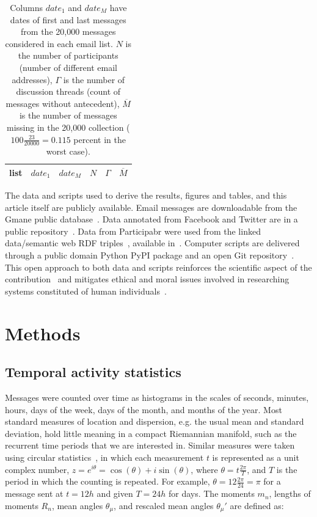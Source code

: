 \documentclass[%
aip,
jmp,%
amsmath,amssymb,
reprint,%
]{revtex4-1}
\begin{document}
\begin{table}
\centering
\caption{Columns $date_1$ and $date_M$ have dates of first and last messages from the 20,000 messages considered in each email list.
$N$ is the number of participants (number of different email addresses),
$\Gamma$ is the number of discussion threads (count of messages without antecedent),
$\overline{M}$ is the number of messages missing in the 20,000 collection
($100\frac{23}{20000}=0.115$ percent in the worst case).
}
\label{tab:genLists}
\begin{tabular}{|l|c|c|c|c|c|}\hline
list & $date_1$ & $date_{M}$    & $N$  & $\Gamma$ & $\overline{M}$ \\\hline

\end{tabular}
\end{table}
The data and scripts used to derive the results, figures and tables, and this article itself are publicly available. Email messages are downloadable from the Gmane public database~\cite{Gmanewikipedia}.
Data annotated from Facebook and Twitter are in a public repository~\cite{fbtwData}.
Data from Participabr were used from the linked data/semantic web RDF triples~\cite{opa}, available in~\cite{datahub}.
Computer scripts are delivered through a public domain Python PyPI package and an open Git repository~\cite{gmanePack}.
This open approach to both data and scripts reinforces the scientific aspect of the contribution~\cite{openSci} and mitigates ethical and moral issues involved in researching systems constituted of human individuals~\cite{anPhy,ccs15}.

\section{Methods}\label{sec:carac}

\subsection{Temporal activity statistics}\label{sec:mtime}
Messages were counted over time as histograms in the scales of seconds,
minutes, hours, days of the week, days of the month, and months of the year.
Most standard measures of location and dispersion, e.g. the usual mean and
standard deviation, hold little meaning in a compact Riemannian manifold,
such as the recurrent time periods that we are interested in.
Similar measures were taken using circular statistics~\cite{directionalStats},
in which each measurement $t$ is represented as a unit complex number,
$z=e^{i\theta}=\cos(\theta)+i\sin(\theta)$, where $\theta=t\frac{2\pi}{T}$,
and $T$ is the period in which the counting is repeated.
For example, $\theta=12\frac{2\pi}{24}=\pi$ for a message sent at $t=12h$ and given $T=24h$ for days.
The moments $m_n$, lengths of moments $R_n$, mean angles $\theta_\mu$, and rescaled mean angles $\theta_\mu'$ are defined as:
\end{document}
